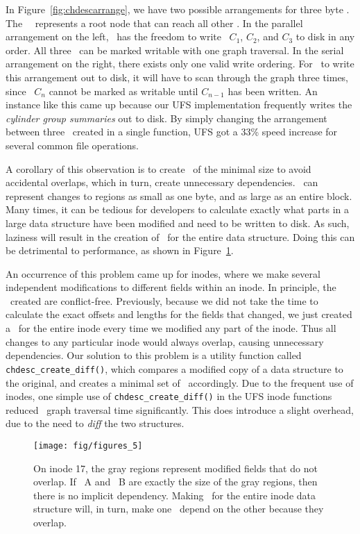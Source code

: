 In Figure~\ref{fig:chdescarrange}, we have two possible arrangements for three
byte \chdescs. The \noop\ \chdesc\ represents a root node that can reach all
other \chdescs. In the parallel arrangement on the left, \Kudos\ has the
freedom to write \chdescs\ $C_1$, $C_2$, and $C_3$ to disk in any order. All
three \chdescs\ can be marked writable with one graph traversal. In the serial
arrangement on the right, there exists only one valid write ordering. For
\Kudos\ to write this arrangement out to disk, it will have to scan through
the graph three times, since \chdesc\ $C_n$ cannot be marked as writable until
$C_{n-1}$ has been written.
An instance like this came up because our UFS implementation frequently writes
the \emph{cylinder group summaries} out to disk. By simply changing the
arrangement between three \chdescs\ created in a single function, UFS got a
33\% speed increase for several common file operations.

A corollary of this observation is to create \chdescs\ of the minimal size to
avoid accidental overlaps, which in turn, create unnecessary dependencies.
\Chdescs\ can represent changes to regions as small as one byte, and as large
as an entire block. Many times, it can be tedious for developers to calculate
exactly what parts in a large data structure have been modified and need to be
written to disk. As such, laziness will result in the creation of \chdescs\
for the entire data structure. Doing this can be detrimental to performance,
as shown in Figure~\ref{fig:overlap}.

An occurrence of this problem came up for inodes, where we make several
independent modifications to different fields within an inode. In principle,
the \chdescs\ created are conflict-free. Previously, because we did not take
the time to calculate the exact offsets and lengths for the fields that
changed, we just created a \chdesc\ for the entire inode every time we modified
any part of the inode. Thus all changes to any particular inode would always
overlap, causing unnecessary dependencies. Our solution to this problem is a
utility function called \texttt{chdesc\_create\_diff()}, which compares a
modified copy of a data structure to the original, and creates a minimal set of
\chdescs\ accordingly. Due to the frequent use of inodes, one simple use of
\texttt{chdesc\_create\_diff()} in the UFS inode functions reduced \chdesc\
graph traversal time significantly. This does introduce a slight
overhead, due to the need to \emph{diff} the two structures.

\begin{figure}[htb]
  \centering
  \texttt{[image: fig/figures\_5]}
  \caption{\label{fig:overlap} On inode 17, the gray regions represent
  modified fields that do not overlap. If \chdesc\ A and \chdesc\ B are
  exactly the size of the gray regions, then there is no implicit dependency.
  Making \chdescs\ for the entire inode data structure will, in turn, make
  one \chdesc\ depend on the other because they overlap.}
\end{figure}

